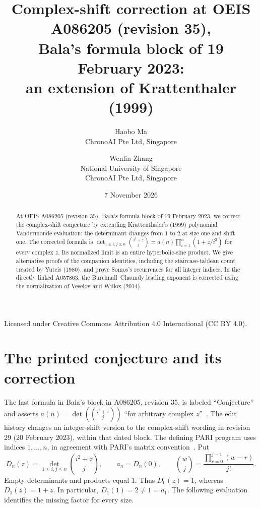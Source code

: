 \documentclass[11pt]{article}
\title{Complex-shift correction at OEIS A086205 (revision 35),\\Bala's formula block of 19 February 2023:\\an extension of Krattenthaler (1999)}
\author{Haobo Ma\\\small ChronoAI Pte Ltd, Singapore\and Wenlin Zhang\\\small National University of Singapore\\\small ChronoAI Pte Ltd, Singapore}
\date{7 November 2026}
\begin{document}
\maketitle
\begin{abstract}
At OEIS A086205 (revision 35), Bala's formula block of 19 February 2023, we correct the
complex-shift conjecture by extending Krattenthaler's (1999) polynomial
Vandermonde evaluation: the determinant changes from $1$ to $2$ at size one
and shift one. The corrected formula is
$\det_{1\le i,j\le n}\binom{i^2+z}{j}=a(n)\prod_{i=1}^n(1+z/i^2)$
for every complex $z$. Its normalized limit is an entire hyperbolic-sine
product. We give alternative proofs of the companion identities, including
the staircase-tableau count treated by Yutcis (1980), and prove Somos's
recurrences for all integer indices. In the directly linked A057863, the
Burchnall--Chaundy leading exponent is corrected using the normalization of
Veselov and Willox (2014).
\end{abstract}
\noindent\small Licensed under Creative Commons Attribution 4.0 International
(CC BY 4.0).\normalsize

\section{The printed conjecture and its correction}
The last formula in Bala's block in A086205, revision 35, is labeled
``Conjecture'' and asserts $a(n)=\det(\binom{i^2+z}{j})$
``for arbitrary complex $z$''~\cite{oeis}.
The edit history changes an integer-shift version to the complex-shift wording
in revision 29 (20 February 2023), within that dated block.
The defining PARI program uses indices $1,\ldots,n$, in agreement with
PARI's matrix convention~\cite{pari}. Put
\[
 D_n(z)=\det_{1\le i,j\le n}\binom{i^2+z}{j},\qquad a_n=D_n(0),
 \qquad \binom{w}{j}=\frac{\prod_{r=0}^{j-1}(w-r)}{j!}.
\]
Empty determinants and products equal $1$. Thus $D_0(z)=1$,
whereas $D_1(z)=1+z$. In particular, $D_1(1)=2\ne1=a_1$.
The following evaluation identifies the missing factor for every size.
\end{document}
